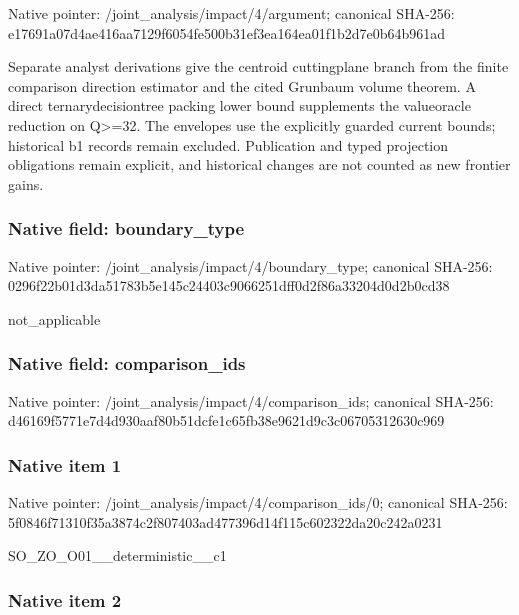 \documentclass[10pt,a4paper]{article}
\begin{document}
Native pointer: /joint\_analysis/impact/4/argument; canonical SHA-256: e17691a07d4ae416aa7129f6\allowbreak{}054fe500b31ef3ea164ea01f\allowbreak{}1b2d7e0b64b961ad


Separate analyst derivations give the centroid cuttingplane branch from the finite comparison direction estimator and the cited Grunbaum volume theorem. A direct ternarydecisiontree packing lower bound supplements the valueoracle reduction on Q>=32. The envelopes use the explicitly guarded current bounds; historical b1 records remain excluded. Publication and typed projection obligations remain explicit, and historical changes are not counted as new frontier gains.


\subsubsection{Native field: boundary\_type}


Native pointer: /joint\_analysis/impact/4/boundary\_type; canonical SHA-256: 0296f22b01d3da51783b5e14\allowbreak{}5c24403c9066251dff0d2f86\allowbreak{}a33204d0d2b0cd38


not\_applicable


\subsubsection{Native field: comparison\_ids}


Native pointer: /joint\_analysis/impact/4/comparison\_ids; canonical SHA-256: d46169f5771e7d4d930aaf80\allowbreak{}b51dcfe1c65fb38e9621d9c3\allowbreak{}c06705312630c969



\subsubsection{Native item 1}


Native pointer: /joint\_analysis/impact/4\allowbreak{}/comparison\_ids/0; canonical SHA-256: 5f0846f71310f35a3874c2f8\allowbreak{}07403ad477396d14f115c602\allowbreak{}322da20c242a0231


SO\_ZO\_O01\_\_deterministic\_\_c1


\subsubsection{Native item 2}
\end{document}
